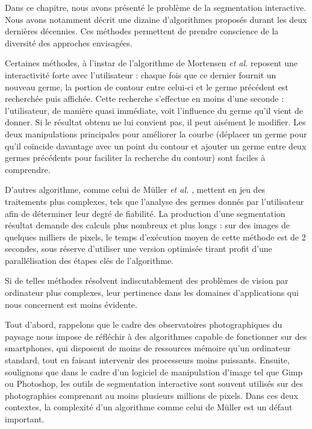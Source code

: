 \begin{emodif}
Dans ce chapitre, nous avons présenté le problème de la segmentation interactive. Nous avons notamment décrit une dizaine d'algorithmes proposés durant les deux dernières décennies. Ces méthodes permettent de prendre conscience de la diversité des approches envisagées. 

Certaines méthodes, à l'instar de l'algorithme de Mortensen \textit{et al.} \cite{mortensen1995intelligent} reposent une interactivité forte avec l'utilisateur : chaque fois que ce dernier fournit un nouveau germe, la portion de contour entre celui-ci et le germe précédent est recherchée puis affichée. Cette recherche s'effectue en moins d'une seconde : l'utilisateur, de manière quasi immédiate, voit l'influence du germe qu'il vient de donner. Si le résultat obtenu ne lui convient pas, il peut aisément le modifier. Les deux manipulations principales pour améliorer la courbe (déplacer un germe pour qu'il coïncide davantage avec un point du contour et ajouter un germe entre deux germes précédents pour faciliter la recherche du contour) sont faciles à comprendre. 

D'autres algorithme, comme celui de Müller \textit{et al.} \cite{muller2016robust}, mettent en jeu des traitements plus complexes, tels que l'analyse des germes donnés par l'utilisateur afin de déterminer leur degré de fiabilité. La production d'une segmentation résultat demande des calculs plus nombreux et plus longs : sur des images de quelques milliers de pixels, le temps d'exécution moyen de cette méthode est de 2 secondes, sous réserve d'utiliser une version optimisée tirant profit d'une parallélisation des étapes clés de l'algorithme. 

Si de telles méthodes résolvent indiscutablement des problèmes de vision par ordinateur plus complexes, leur pertinence dans les domaines d'applications qui nous concernent est moins évidente. 

Tout d'abord, rappelons que le cadre des observatoires photographiques du paysage nous impose de réfléchir à des algorithmes capable de fonctionner sur des smartphones, qui disposent de moins de ressources mémoire qu'un ordinateur 
standard, tout en faisant intervenir des processeurs moins puissants. Ensuite, soulignons que dans le cadre d'un logiciel de manipulation d'image tel que Gimp ou Photoshop, les outils de segmentation interactive sont souvent utilisés sur des photographies comprenant au moins plusieurs millions de pixels. Dans ces deux contextes, la complexité d'un algorithme comme celui de Müller est un défaut important. 


\end{emodif}
